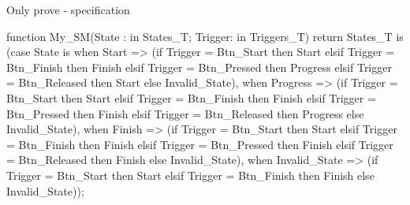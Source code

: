 \documentclass{beamer}
\begin{document}
\begin{frame}[fragile]{Only prove - specification}
  \begin{pxcode}[language=SPARK,style=magic,gobble=3]
   function My_SM(State : in States_T; Trigger: in Triggers_T)
                  return States_T is
     (case State is
         when Start =>
         (if    Trigger = Btn_Start    then Start
          elsif Trigger = Btn_Finish   then Finish
          elsif Trigger = Btn_Pressed  then Progress
          elsif Trigger = Btn_Released then Start
          else                              Invalid_State),
         when Progress =>
         (if    Trigger = Btn_Start    then Start
          elsif Trigger = Btn_Finish   then Finish
          elsif Trigger = Btn_Pressed  then Finish
          elsif Trigger = Btn_Released then Progress
          else                              Invalid_State),
         when Finish =>
         (if    Trigger = Btn_Start    then Start
          elsif Trigger = Btn_Finish   then Finish
          elsif Trigger = Btn_Pressed  then Finish
          elsif Trigger = Btn_Released then Finish
          else                              Invalid_State),
         when Invalid_State =>
         (if    Trigger = Btn_Start    then Start
          elsif Trigger = Btn_Finish   then Finish
          else                              Invalid_State));

  \end{pxcode}
\end{frame}
\end{document}
